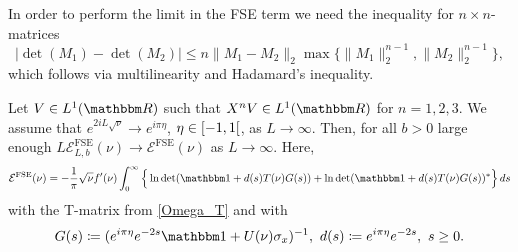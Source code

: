 In order to perform the limit in the FSE term we need the inequality for $n\times n$-matrices
\begin{equation}\label{det_difference_matrix}
  |\det(M_1) - \det(M_2)| \leq n \|M_1-M_2\|_2 \max\{\|M_1\|_2^{n-1},\|M_2\|_2^{n-1}\},
\end{equation}
which follows via multilinearity and Hadamard's inequality.

\begin{lemma}\label{fse01t}
Let $V\in L^1(\R)$ such that $X^nV\in L^1(\R)$ for $n=1,2,3$. We assume that $e^{2iL\sqrt{\nu}}\to e^{i\pi\eta}$,
$\eta\in\interval[open right]{-1}{1}$, as $L\to\infty$. 
Then, for all $b>0$ large enough $L\mathcal{E}^{\mathrm{FSE}}_{L,b}(\nu)\to\mathcal{E}^{\mathrm{FSE}}(\nu)$ as $L\to\infty$. Here,
\begin{equation}\label{fse01t01}
  \mathcal{E}^{\mathrm{FSE}}(\nu)
     = - \frac{1}{\pi} \sqrt{\nu} f'(\nu) \int_0^\infty \Big\{\ln\det(\id + d(s) T(\nu) G(s)) + \ln\det(\id + d(s) T(\nu) G(s))^* \Big\}\, ds
\end{equation}
with the T-matrix from \eqref{Omega_T} and with
\begin{equation}\label{fse01t02}
  G(s) \coloneqq  (e^{i\pi\eta}e^{-2s}\id + U(\nu)\sigma_x)^{-1},\ d(s)\coloneqq e^{i\pi\eta}e^{-2s},\ s\geq 0.
\end{equation}
\end{lemma}
